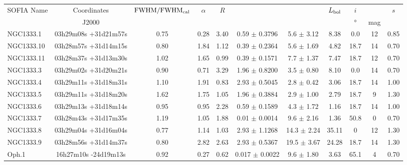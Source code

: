 \begin{landscape}
\begin{table}[!h]
\scriptsize
\caption[Fitted parameters]{Fitted parameters for the three clusters where long-wavelength photometry is available.}
\label{tab:FittedParameters}
\vspace{-0.5cm}
\hspace*{-1.5cm}
\begin{center}
\begin{longtable}{lcccccccccc}

\toprule																									
SOFIA Name	&	Coordinates	&	$\textrm{FWHM}/\textrm{FWHM}_\textrm{cal}$	&	$\alpha$	&	$R$	&	\Menv			&	\Ltot			&	$L_\textrm{bol}$	&	$i$	&	\Av	&	$s$	\\
	&	J2000	&		&		&		&	\si{\Msun}			&	\si{\Lsun}			&	\si{\Lsun}	&	\si{\degree}	&	mag	&		\\
\midrule																									
NGC1333.1	&	03h29m08s +31d21m57s	&	0.75	&	0.28	&	3.40	&	0.59	$\pm$	0.3796	&	5.6	$\pm$	3.12	&	8.38	&	0.0	&	12	&	0.85	\\
NGC1333.10	&	03h28m57s +31d14m15s	&	0.80	&	1.84	&	1.12	&	0.39	$\pm$	0.2364	&	5.6	$\pm$	1.69	&	4.82	&	18.7	&	14	&	0.70	\\
NGC1333.11	&	03h28m37s +31d13m30s	&	1.02	&	1.65	&	0.99	&	0.39	$\pm$	0.1571	&	7.7	$\pm$	1.37	&	7.47	&	18.7	&	12	&	0.70	\\
NGC1333.3	&	03h29m02s +31d20m21s	&	0.90	&	0.71	&	3.29	&	1.96	$\pm$	0.8200	&	3.5	$\pm$	0.80	&	8.10	&	0.0	&	14	&	0.70	\\
NGC1333.4	&	03h29m11s +31d18m31s	&	1.10	&	1.91	&	0.83	&	2.93	$\pm$	0.5045	&	2.8	$\pm$	0.42	&	3.06	&	18.7	&	14	&	1.00	\\
NGC1333.5	&	03h29m11s +31d18m20s	&	1.62	&	1.75	&	1.05	&	1.96	$\pm$	0.3884	&	2.9	$\pm$	1.00	&	2.79	&	18.7	&	9	&	1.30	\\
NGC1333.6	&	03h29m13s +31d18m14s	&	0.95	&	0.95	&	2.28	&	0.59	$\pm$	0.1589	&	4.3	$\pm$	1.72	&	1.16	&	18.7	&	14	&	1.00	\\
NGC1333.7	&	03h28m43s +31d17m35s	&	1.19	&	1.05	&	1.88	&	0.01	$\pm$	0.0014	&	9.6	$\pm$	2.16	&	1.36	&	50.8	&	0	&	0.70	\\
NGC1333.8	&	03h29m04s +31d16m04s	&	0.77	&	1.14	&	1.03	&	2.93	$\pm$	1.1268	&	14.3	$\pm$	2.24	&	35.11	&0	&	12	&	1.30	\\
NGC1333.9	&	03h28m56s +31d14m37s	&	0.80	&	2.82	&	2.63	&	2.93	$\pm$	0.5367	&	19.5	$\pm$	3.67	&	24.28	&	18.7	&	14	&	1.30	\\
Oph.1	&	16h27m10s -24d19m13s	&	0.92	&	0.27	&	0.62	&	0.017	$\pm$	0.0022	&	9.6	$\pm$	1.80	&	3.63	&	65.1	&	4	&	0.70	\\

\end{longtable}
\end{center}
\end{table}
\end{landscape}
